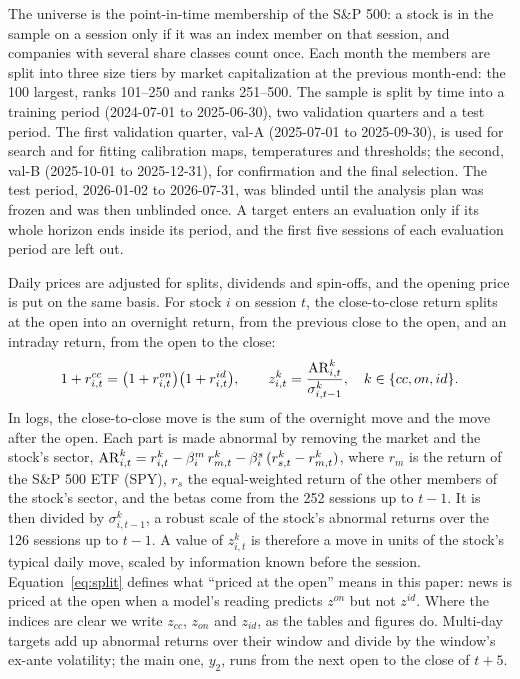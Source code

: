 The universe is the point-in-time membership of the S\&P 500: a stock is in the sample on a session only if it
was an index member on that session, and companies with several share classes count once. Each month the
members are split into three size tiers by market capitalization at the previous month-end: the 100 largest,
ranks 101--250 and ranks 251--500. The sample is split by time into a training period (2024-07-01 to
2025-06-30), two validation quarters and a test period. The first validation quarter, val-A (2025-07-01 to
2025-09-30), is used for search and for fitting calibration maps, temperatures and thresholds; the second, val-B
(2025-10-01 to 2025-12-31), for confirmation and the final selection. The test period, 2026-01-02 to
2026-07-31, was blinded until the analysis plan was frozen and was then unblinded once. A target enters an
evaluation only if its whole horizon ends inside its period, and the first five sessions of each evaluation
period are left out.

Daily prices are adjusted for splits, dividends and spin-offs, and the opening price is put on the same basis.
For stock $i$ on session $t$, the close-to-close return splits at the open into an overnight return, from the
previous close to the open, and an intraday return, from the open to the close:
\begin{equation}\label{eq:split}
1 + r^{cc}_{i,t} = \bigl(1 + r^{on}_{i,t}\bigr)\bigl(1 + r^{id}_{i,t}\bigr),
\qquad
z^{k}_{i,t} = \frac{\mathrm{AR}^{k}_{i,t}}{\sigma^{k}_{i,t-1}}, \quad k \in \{cc, on, id\}.
\end{equation}
In logs, the close-to-close move is the sum of the overnight move and the move after the open. Each part is made
abnormal by removing the market and the stock's sector, $\mathrm{AR}^{k}_{i,t} = r^{k}_{i,t} - \beta^{m}_{i}\,
r^{k}_{m,t} - \beta^{s}_{i}\,(r^{k}_{s,t} - r^{k}_{m,t})$, where $r_{m}$ is the return of the S\&P 500 ETF
(SPY), $r_{s}$ the equal-weighted return of the other members of the stock's sector, and the betas come from
the 252 sessions up to $t-1$. It is then divided by $\sigma^{k}_{i,t-1}$, a robust scale of the stock's abnormal
returns over the 126 sessions up to $t-1$. A value of $z^{k}_{i,t}$ is therefore a move in units of the stock's
typical daily move, scaled by information known before the session. Equation~\eqref{eq:split} defines what
``priced at the open'' means in this paper: news is priced at the open when a model's reading predicts $z^{on}$
but not $z^{id}$. Where the indices are clear we write $z_{cc}$, $z_{on}$ and $z_{id}$, as the tables and figures
do. Multi-day targets add up abnormal returns over their window and divide by the window's ex-ante volatility;
the main one, $y_2$, runs from the next open to the close of $t+5$.

